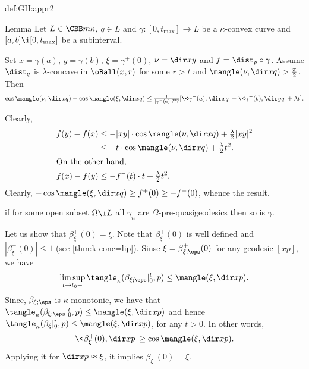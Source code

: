 {\begin{subthm}{def:GH:appr2}
\begin{thm}{Lemma}\label{lem:angle-d}
Let $L\in\CBB m \kappa$, 
$q\in L$
and $\gamma:[0,t_{\max}]\to L$ be a $\kappa$-convex curve
and $[a,b]\i [0,t_{\max}]$ be a subinterval.

Set 
$x=\gamma(a)$, 
$y=\gamma(b)$,
$\xi=\gamma^+(0)$, 
$\nu=\dir x y$ 
and
$f=\dist_p\circ\gamma$.
Assume $\dist_q$ is $\lambda$-concave in $\oBall(x,r)$ for some $r>t$ and $\mangle(\nu,\dir x q)>\tfrac\pi2$.
Then
$$\cos\mangle(\nu,\dir x q)-\cos\mangle(\xi,\dir x q)\le
\tfrac1{|\gamma^-(a)|???}[\<\gamma^+(a),\dir x q\>-\<\gamma^-(b),\dir y q\>+\lambda t].$$

\end{thm}

 Clearly, 
\begin{align*}
f(y)-f(x)&\le -|x y|\cdot\cos\mangle(\nu,\dir x q)+\tfrac\lambda2|x y|^2
\\
&\le-t\cdot\cos\mangle(\nu,\dir x q)+\tfrac\lambda2t^2.
\\
\intertext{On the other hand, }
f(x)-f(y)
&\le 
-f^-(t)\cdot t+\tfrac\lambda2t^2.
\end{align*}
Clearly, $-\cos\mangle(\xi,\dir x q)\ge f^+(0)\ge -f^-(0)$, whence the result.
\qeds










\begin{subthm}{} if for some open subset $\Omega\i L$ all $\gamma_n$ are $\Omega$-pre-quasigeodesics then so is $\gamma$.
\end{subthm}






















Let us show that $\beta_{\xi}^+(0)=\xi$.
Note  that $\beta_{\xi}^+(0)$ is well defined and $|\beta_{\xi}^+(0)|\le1$ (see \ref{thm:k-conc=lip}).
Sinse $\xi=\beta_{\xi;\eps}^+(0)$ for any geodesic $[x p]$, we have 
$$\limsup_{t\to t_0+}\tangle_\kappa(\beta_{\xi;\eps}|_0^t,p)
\le
\mangle(\xi,\dir x p).$$
Since, $\beta_{\xi;\eps}$ is $\kappa$-monotonic, we have that
$\tangle_\kappa(\beta_{\xi;\eps}|_0^t,p)\le \mangle(\xi,\dir x p)$
 and hence $\tangle_\kappa(\beta_{\xi}|_0^t,p)\le \mangle(\xi,\dir x p)$,
 for any $t>0$.
In other words, 
$$\<\beta_{\xi}^+(0),\dir x p\>\ge \cos\mangle(\xi,\dir x p).$$
Applying it for $\dir x p\approx \xi$, it implies $\beta_{\xi}^+(0)=\xi$.









\end{subthm}}
